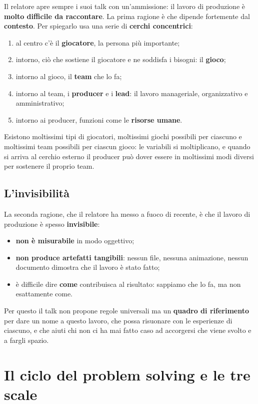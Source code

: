 Il relatore apre sempre i suoi talk con un'ammissione: il lavoro di produzione è
\textbf{molto difficile da raccontare}. La prima ragione è che dipende fortemente
dal \textbf{contesto}. Per spiegarlo usa una serie di \textbf{cerchi concentrici}:
\begin{enumerate}
  \item al centro c'è il \textbf{giocatore}, la persona più importante;
  \item intorno, ciò che sostiene il giocatore e ne soddisfa i bisogni: il
        \textbf{gioco};
  \item intorno al gioco, il \textbf{team} che lo fa;
  \item intorno al team, i \textbf{producer} e i \textbf{lead}: il lavoro
        manageriale, organizzativo e amministrativo;
  \item intorno ai producer, funzioni come le \textbf{risorse umane}.
\end{enumerate}
Esistono moltissimi tipi di giocatori, moltissimi giochi possibili per ciascuno e
moltissimi team possibili per ciascun gioco: le variabili si moltiplicano, e quando
si arriva al cerchio esterno il producer può dover essere in moltissimi modi diversi
per sostenere il proprio team.

\subsection{L'invisibilità}

La seconda ragione, che il relatore ha messo a fuoco di recente, è che il lavoro di
produzione è spesso \textbf{invisibile}:
\begin{itemize}
  \item \textbf{non è misurabile} in modo oggettivo;
  \item \textbf{non produce artefatti tangibili}: nessun file, nessuna animazione,
        nessun documento dimostra che il lavoro è stato fatto;
  \item è difficile dire \textbf{come} contribuisca al risultato: sappiamo che lo
        fa, ma non esattamente come.
\end{itemize}
Per questo il talk non propone regole universali ma un \textbf{quadro di
riferimento} per dare un nome a questo lavoro, che possa risuonare con le esperienze
di ciascuno, e che aiuti chi non ci ha mai fatto caso ad accorgersi che viene svolto
e a fargli spazio.

\section{Il ciclo del problem solving e le tre scale}
\label{sec:c3-3-ciclo}


